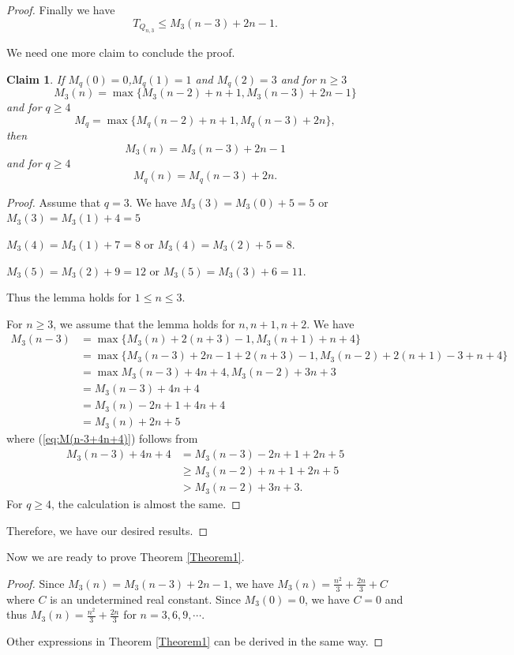 \documentclass[reqno,11pt]{amsart}
\newtheorem{claim}[theorem]{Claim}
\renewcommand{\leq}{\leqslant}
\renewcommand{\geq}{\geqslant}
\begin{document}
\begin{proof}

Finally we have 
$$T_{Q_{n,3}} \leq M_3(n-3)+2n-1.$$

We need one more claim to conclude the proof. 
\begin{claim}
If $M_q(0)=0$,$M_q(1)=1$ and $M_q(2)=3$ and  
for $n \geq 3$ 
$$M_3(n)=\max\{M_3(n-2)+n+1,M_3(n-3)+2n-1\}$$
and for $q \geq 4$
$$M_q=\max\{M_q(n-2)+n+1,M_q(n-3)+2n\},$$ then 
$$M_3(n)=M_3(n-3)+2n-1$$
and for $q \geq 4$
$$M_q(n)=M_q(n-3)+2n.$$
\end{claim}
\begin{proof}
Assume that $q=3$. We have $M_3(3)=M_3(0)+5=5$ or $M_3(3)=M_3(1)+4=5$

$M_3(4)=M_3(1)+7=8$ or 
$M_3(4)=M_3(2)+5=8$.

$M_3(5)=M_3(2)+9=12$ or 
$M_3(5)=M_3(3)+6=11$.

Thus the lemma holds for $ 1 \leq n \leq 3$.

For $n \geq 3$, we assume that the lemma holds for $n,n+1,n+2$. We have 
\begin{align}
    M_3(n-3)& =\max\{M_3(n)+2(n+3)-1,M_3(n+1)+n+4\}\\
    &=\max\{M_3(n-3)+2n-1+2(n+3)-1, M_3(n-2)+2(n+1)-3+n+4\}\\
    &= \max{M_3(n-3)+4n+4,M_3(n-2)+3n+3}\\
   \label{eq:M(n-3+4n+4)} &=M_3(n-3)+4n+4\\ 
    &=M_3(n)-2n+1+4n+4\\
    &=M_3(n)+2n+5
\end{align}
where (\ref{eq:M(n-3+4n+4)}) follows from 
\begin{align*}
    M_3(n-3)+4n+4& =M_3(n-3)-2n+1+2n+5\\
    & \geq M_3(n-2)+n+1+2n+5\\
    & > M_3(n-2)+3n+3.
\end{align*}
For $q \geq 4$, the calculation is almost the same. 
\end{proof}
Therefore, we have our desired results.
\end{proof} 
Now we are ready to prove Theorem \ref{Theorem1}. 

\begin{proof}
Since $M_3(n)=M_3(n-3)+2n-1$, we have $M_3(n)=\frac{n^2}{3}+\frac{2n}{3}+C$ where $C$ is an undetermined real constant. Since $M_3(0)=0$, we have $C=0$ and thus $M_3(n)=\frac{n^2}{3}+\frac{2n}{3}$ for $n=3,6,9,\cdots$.

Other expressions in Theorem \ref{Theorem1} can be derived in the same way. 
\end{proof}
\end{document}
